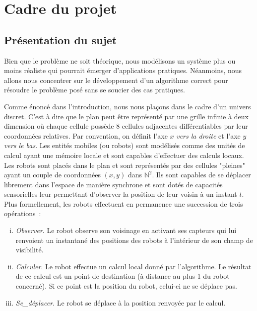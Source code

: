 \newcommand{\Observer}{\textit{Observer}\xspace}
\newcommand{\Calculer}{\textit{Calculer}\xspace}
\newcommand{\SeDeplacer}{\textit{Se\_déplacer}\xspace}

\newcommand{\outil}[1]{\textit{#1}\xspace}

\section{Cadre du projet}

\subsection{Présentation du sujet}

Bien que le problème ne soit théorique, nous modélisons un système plus ou
moins réaliste qui pourrait émerger d'applications pratiques. Néanmoins, nous
allons nous concentrer sur le développement d'un algorithme correct pour
résoudre le problème posé sans se soucier des cas pratiques.

Comme énoncé dans l'introduction, nous nous plaçons dans le cadre d'un univers
discret. C'est à dire que le plan peut être représenté par une grille infinie à
deux dimension où chaque cellule possède 8 cellules adjacentes différentiables
par leur coordonnées relatives. Par convention, on définit l'axe $x$
\textit{vers la droite} et l'axe $y$ \textit{vers le bas}. Les entités mobiles
(ou robots) sont modélisés comme des unités de calcul ayant une mémoire locale
et sont capables d'effectuer des calculs locaux. Les robots sont placés dans le
plan et sont représentés par des cellules "pleines" ayant un couple de
coordonnées $(x,y)$ dans $\mathbb{N}^2$. Ils sont capables de se déplacer
librement dans l'espace de manière synchrone et sont dotés de capacités
sensorielles leur permettant d'observer la position de leur voisin à un instant
$t$. Plus formellement, les robots effectuent en permanence une succession de
trois opérations~:
\begin{enumerate}[(i)]
  \item \Observer. Le robot observe son voisinage en activant ses capteurs qui
  lui renvoient un instantané des positions des robots à l'intérieur de son
  champ de visibilité.
  \item \Calculer. Le robot effectue un calcul local donné par l'algorithme. Le
  résultat de ce calcul est un point de destination (à distance au plus 1 du
  robot concerné). Si ce point est la position du robot, celui-ci ne se déplace
  pas.
  \item \SeDeplacer. Le robot se déplace à la position renvoyée par le calcul.
  \\
\end{enumerate}

